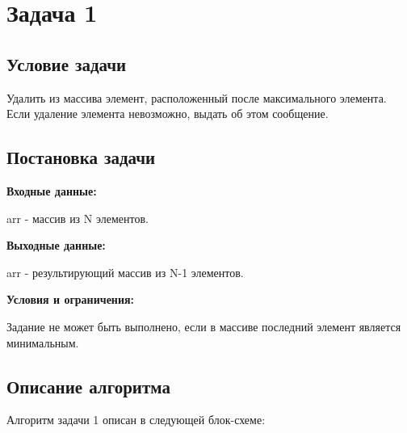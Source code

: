 \section{Задача 1}
\subsection{Условие задачи}

Удалить из массива элемент, расположенный после максимального элемента. Если удаление элемента невозможно, выдать об этом сообщение.

\subsection{Постановка задачи}
\textbf{Входные данные:}

arr - массив из N элементов.

\textbf{Выходные данные:}

arr - результирующий массив из N-1 элементов.

\textbf{Условия и ограничения:}

Задание не может быть выполнено, если в массиве последний элемент является минимальным.



\subsection{Описание алгоритма}

Алгоритм задачи 1 описан в следующей блок-схеме:

